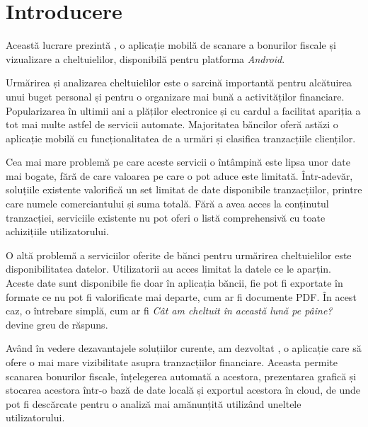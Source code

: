 \chapter{Introducere}\label{introducere}
\setcounter{page}{1}

Această lucrare prezintă \AppNameB, o aplicație mobilă de scanare a bonurilor fiscale și vizualizare a cheltuielilor, disponibilă pentru platforma \emph{Android}.


Urmărirea și analizarea cheltuielilor este o sarcină importantă pentru alcătuirea unui buget personal și pentru o organizare mai bună a activităților financiare. Popularizarea în ultimii ani a plăților electronice și cu cardul a facilitat apariția a tot mai multe astfel de servicii automate. Majoritatea băncilor oferă astăzi o aplicație mobilă cu funcționalitatea de a urmări și clasifica tranzacțiile clienților.

Cea mai mare problemă pe care aceste servicii o întâmpină este lipsa unor date mai bogate, fără de care valoarea pe care o pot aduce este limitată. Într-adevăr, soluțiile existente valorifică un set limitat de date disponibile tranzacțiilor, printre care numele comerciantului și suma totală. Fără a avea acces la conținutul tranzacției, serviciile existente nu pot oferi o listă comprehensivă cu toate achizițiile utilizatorului.

O altă problemă a serviciilor oferite de bănci pentru urmărirea cheltuielilor este disponibilitatea datelor. Utilizatorii au acces limitat la datele ce le aparțin. Aceste date sunt disponibile fie doar în aplicația băncii, fie pot fi exportate în formate ce nu pot fi valorificate mai departe, cum ar fi documente PDF. În acest caz, o întrebare simplă, cum ar fi \textit{Cât am cheltuit în această lună pe pâine?} devine greu de răspuns.

Având în vedere dezavantajele soluțiilor curente, am dezvoltat \AppName, o aplicație care să ofere o mai mare vizibilitate asupra tranzacțiilor financiare. Aceasta permite scanarea bonurilor fiscale, înțelegerea automată a acestora, prezentarea grafică și stocarea acestora într-o bază de date locală și exportul acestora în cloud, de unde pot fi descărcate pentru o analiză mai amănunțită utilizând uneltele utilizatorului.


